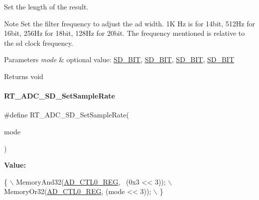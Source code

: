 Set the length of the result. 

\begin{DoxyNote}{Note}
Set the filter frequency to adjust the ad width. 1K Hz is for 14bit, 512\+Hz for 16bit, 256\+Hz for 18bit, 128\+Hz for 20bit. The frequency mentioned is relative to the sd clock frequency. 
\end{DoxyNote}

\begin{DoxyParams}{Parameters}
{\em mode} & optional value\+: \mbox{\hyperlink{a00002_a44030e617a742aba101c6dcd3ec2078ea9c86002a4a99d0d440bca9b7f8d2ec93}{S\+D\+\_\+B\+IT}}, \mbox{\hyperlink{a00002_a44030e617a742aba101c6dcd3ec2078ea43562124882d2ecf1ce1b062c46e035c}{S\+D\+\_\+B\+IT}}, \mbox{\hyperlink{a00002_a44030e617a742aba101c6dcd3ec2078eacac5c6814a8f28e35ebeef99751a9d5f}{S\+D\+\_\+B\+IT}}, \mbox{\hyperlink{a00002_a44030e617a742aba101c6dcd3ec2078ea3a9f3242e2567dcfb29f566e45cf6de0}{S\+D\+\_\+B\+IT}} \\
\hline
\end{DoxyParams}
\begin{DoxyReturn}{Returns}
void 
\end{DoxyReturn}
\mbox{\label{a00002_a246ce987fa2b9f254f4796340eb23ed0}} 
\paragraph{\texorpdfstring{R\+T\+\_\+\+A\+D\+C\+\_\+\+S\+D\+\_\+\+Set\+Sample\+Rate}{RT\_ADC\_SD\_SetSampleRate}}
{\footnotesize\ttfamily \#define R\+T\+\_\+\+A\+D\+C\+\_\+\+S\+D\+\_\+\+Set\+Sample\+Rate(\begin{DoxyParamCaption}\item[{}]{mode }\end{DoxyParamCaption})}

{\bfseries Value\+:}
\begin{DoxyCode}
\{                                          \(\backslash\)
        MemoryAnd32(\mbox{\hyperlink{a00020_adadaa0ab1ebbd7ba9b70dfd24c3ed44da479497b755dee411ad6348cae2ef26b4}{AD\_CTL0\_REG}}, ~(0x3 << 3)); \(\backslash\)
        MemoryOr32(\mbox{\hyperlink{a00020_adadaa0ab1ebbd7ba9b70dfd24c3ed44da479497b755dee411ad6348cae2ef26b4}{AD\_CTL0\_REG}}, (mode << 3));  \(\backslash\)
    \}
\end{DoxyCode}


